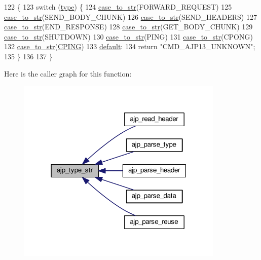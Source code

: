 \begin{DoxyCode}
122 \{
123     \textcolor{keywordflow}{switch} (\hyperlink{group__APACHE__CORE__HTTPD_gaafc7089562892428c4fcae486f171f5a}{type}) \{
124         \hyperlink{ajp__utils_8c_a5d0b37a802c89b9ac1d37ef665a46589}{case\_to\_str}(FORWARD\_REQUEST)
125         \hyperlink{ajp__utils_8c_a5d0b37a802c89b9ac1d37ef665a46589}{case\_to\_str}(SEND\_BODY\_CHUNK)
126         \hyperlink{ajp__utils_8c_a5d0b37a802c89b9ac1d37ef665a46589}{case\_to\_str}(SEND\_HEADERS)
127         \hyperlink{ajp__utils_8c_a5d0b37a802c89b9ac1d37ef665a46589}{case\_to\_str}(END\_RESPONSE)
128         \hyperlink{ajp__utils_8c_a5d0b37a802c89b9ac1d37ef665a46589}{case\_to\_str}(GET\_BODY\_CHUNK)
129         \hyperlink{ajp__utils_8c_a5d0b37a802c89b9ac1d37ef665a46589}{case\_to\_str}(SHUTDOWN)
130         \hyperlink{ajp__utils_8c_a5d0b37a802c89b9ac1d37ef665a46589}{case\_to\_str}(PING)
131         \hyperlink{ajp__utils_8c_a5d0b37a802c89b9ac1d37ef665a46589}{case\_to\_str}(CPONG)
132         \hyperlink{ajp__utils_8c_a5d0b37a802c89b9ac1d37ef665a46589}{case\_to\_str}(\hyperlink{group__MOD__PROXY_gga4e8622ade6bde29385df7b89c9b94e71ab3abbc8920d4d4022836301ad08e1204}{CPING})
133         \hyperlink{README_8txt_a33aad17802c273a2a50ec1e2c2d3043c}{default}:
134             return "CMD\_AJP13\_UNKNOWN";
135     \}
136 
137 \}
\end{DoxyCode}


Here is the caller graph for this function\+:
\nopagebreak
\begin{figure}[H]
\begin{center}
\leavevmode
\includegraphics[width=279pt]{group__AJP__api_gaa06a16af9a5eeb0f726fc5b55c0e6fe2_icgraph}
\end{center}
\end{figure}


